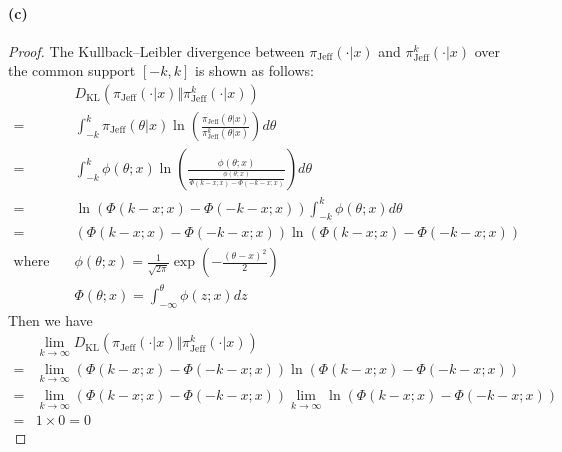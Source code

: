 \paragraph{(c)}
\begin{proof}
The Kullback–Leibler divergence between $\pi_\mathrm{Jeff} (\cdot \vert x)$ and $\pi_\mathrm{Jeff}^k (\cdot \vert x)$ over the common support $[-k, k]$ is shown as follows:
\begin{align*}
    &D_{\mathrm{KL}}\left( \pi_\mathrm{Jeff} (\cdot \vert x) \Vert \pi_\mathrm{Jeff}^k (\cdot \vert x)\right)\\
    =& \int_{-k}^{k}  \pi_\mathrm{Jeff} (\theta \vert x)
        \ln \left( \frac{\pi_\mathrm{Jeff} (\theta \vert x)}{\pi_\mathrm{Jeff}^k (\theta \vert x)} \right) d\theta \\
    =& \int_{-k}^{k}  \phi(\theta; x) \ln \left( 
        \frac{\phi(\theta; x)}{ \frac{\phi(\theta;x)}{\Phi(k-x;x) - \Phi(-k-x;x)}}
        \right)d\theta \\
    =& \ln \left( \Phi(k-x;x) - \Phi(-k-x;x) \right) \int_{-k}^{k}
        \phi(\theta;x)d\theta\\
    =& \left( \Phi(k-x;x) - \Phi(-k-x;x) \right) \ln \left( \Phi(k-x;x) - \Phi(-k-x;x) \right)\\
    \text{where}\quad
    &\phi(\theta;x) = \frac{1}{\sqrt{2\pi}}\exp \left( -\frac{(\theta - x)^2}{2}\right)\\
    &\Phi(\theta;x) = \int_{-\infty}^{\theta} \phi(z;x) dz
\end{align*}
Then we have
\begin{align*}
    &\lim_{k\rightarrow \infty} D_{\mathrm{KL}}\left( \pi_\mathrm{Jeff} (\cdot \vert x) \Vert \pi_\mathrm{Jeff}^k (\cdot \vert x)\right)\\
    =&\lim_{k\rightarrow \infty} \left( \Phi(k-x;x) - \Phi(-k-x;x) \right) \ln \left( \Phi(k-x;x) - \Phi(-k-x;x) \right)\\
    =& \lim_{k\rightarrow \infty} \left( \Phi(k-x;x) - \Phi(-k-x;x) \right)
        \lim_{k\rightarrow \infty}\ln \left( \Phi(k-x;x) - \Phi(-k-x;x) \right)\\
    =& 1\times 0 = 0
\end{align*}
\end{proof}

